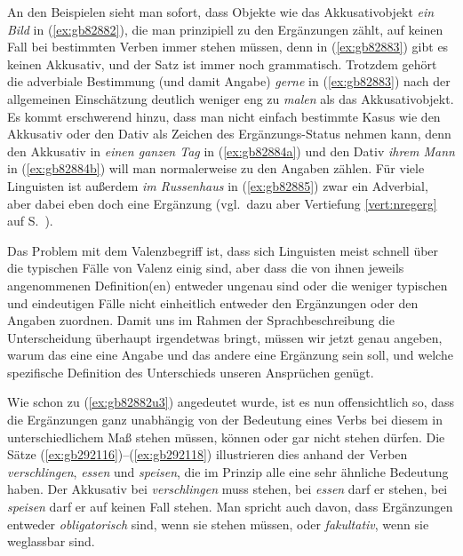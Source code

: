 An den Beispielen sieht man sofort, dass Objekte wie das Akkusativobjekt \textit{ein Bild} in (\ref{ex:gb82882}), die man prinzipiell zu den Ergänzungen zählt, auf keinen Fall bei bestimmten Verben immer stehen müssen, denn in (\ref{ex:gb82883}) gibt es keinen Akkusativ, und der Satz ist immer noch grammatisch.
Trotzdem gehört die adverbiale Bestimmung (und damit Angabe) \textit{gerne} in (\ref{ex:gb82883}) nach der allgemeinen Einschätzung deutlich weniger eng zu \textit{malen} als das Akkusativobjekt.
Es kommt erschwerend hinzu, dass man nicht einfach bestimmte Kasus wie den Akkusativ oder den Dativ als Zeichen des Ergänzungs-Status nehmen kann, denn den Akkusativ in \textit{einen ganzen Tag} in (\ref{ex:gb82884a}) und den Dativ \textit{ihrem Mann} in (\ref{ex:gb82884b}) will man normalerweise zu den Angaben zählen.
Für viele Linguisten ist außerdem \textit{im Russenhaus} in (\ref{ex:gb82885}) zwar ein Adverbial, aber dabei eben doch eine Ergänzung (vgl.\ dazu aber Vertiefung \ref{vert:nregerg} auf S.~\pageref{vert:nregerg}).

\begin{exe}
  \ex\label{ex:gb82884} 
  \begin{xlist}
  \end{xlist}
\end{exe}

Das Problem mit dem Valenzbegriff ist, dass sich Linguisten meist schnell über die typischen Fälle von Valenz einig sind, aber dass die von ihnen jeweils angenommenen Definition(en) entweder ungenau sind oder die weniger typischen und eindeutigen Fälle nicht einheitlich entweder den Ergänzungen oder den Angaben zuordnen.
Damit uns im Rahmen der Sprachbeschreibung die Unterscheidung überhaupt irgendetwas bringt, müssen wir jetzt genau angeben, warum das eine eine Angabe und das andere eine Ergänzung sein soll, und welche spezifische Definition des Unterschieds unseren Ansprüchen genügt.

Wie schon zu (\ref{ex:gb82882u3}) angedeutet wurde, ist es nun offensichtlich so, dass die Ergänzungen ganz unabhängig von der Bedeutung eines Verbs bei diesem in unterschiedlichem Maß stehen müssen, können oder gar nicht stehen dürfen.
Die Sätze (\ref{ex:gb292116})--(\ref{ex:gb292118}) illustrieren dies anhand der Verben \textit{verschlingen}, \textit{essen} und \textit{speisen}, die im Prinzip alle eine sehr ähnliche Bedeutung haben.
Der Akkusativ bei \textit{verschlingen} muss stehen, bei \textit{essen} darf er stehen, bei \textit{speisen} darf er auf keinen Fall stehen.
Man spricht auch davon, dass Ergänzungen entweder \textit{obligatorisch} sind, wenn sie stehen müssen, oder \textit{fakultativ}, wenn sie weglassbar sind.

